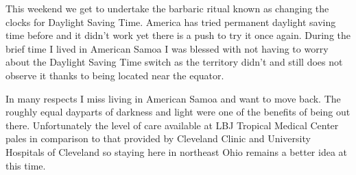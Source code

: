 This weekend we get to undertake the barbaric ritual known as changing
the clocks for Daylight Saving Time. America has tried permanent
daylight saving time before and it didn't work yet there is a push to
try it once again. During the brief time I lived in American Samoa I was
blessed with not having to worry about the Daylight Saving Time switch
as the territory didn't and still does not observe it thanks to being
located near the equator.

In many respects I miss living in American Samoa and want to move back.
The roughly equal dayparts of darkness and light were one of the
benefits of being out there. Unfortunately the level of care available
at LBJ Tropical Medical Center pales in comparison to that provided by
Cleveland Clinic and University Hospitals of Cleveland so staying here
in northeast Ohio remains a better idea at this time.
